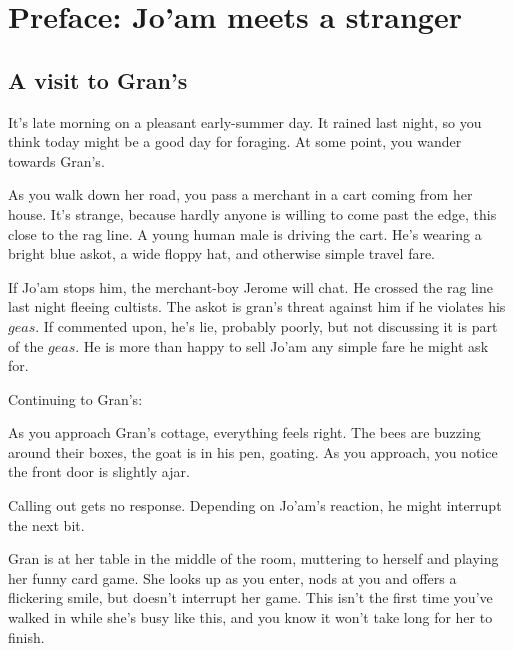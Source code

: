 \section{Preface: Jo'am meets a stranger}\label{sec:joamMeetsAStranger}

\subsection{A visit to Gran's}
\begin{multicols}{2}
  \begin{aloud}
  It's late morning on a pleasant early-summer day.
  It rained last night, so you think today might be a good day for foraging.
  At some point, you wander towards Gran's.

  As you walk down her road, you pass a merchant in a cart coming from her house.
  It's strange, because hardly anyone is willing to come past the edge, this close to the rag line.
  A young human male is driving the cart.
  He's wearing a bright blue askot, a wide floppy hat, and otherwise simple travel fare.
  \end{aloud}

If Jo'am stops him, the merchant-boy Jerome will chat.
He crossed the rag line last night fleeing cultists.
The askot is gran's threat against him if he violates his $geas$.
If commented upon, he's lie, probably poorly, but not discussing it is part of the $geas$.
He is more than happy to sell Jo'am any simple fare he might ask for.

Continuing to Gran's:

  \begin{aloud}
  As you approach Gran's cottage, everything feels right.
  The bees are buzzing around their boxes, the goat is in his pen, goating.
  As you approach, you notice the front door is slightly ajar.
  \end{aloud}

Calling out gets no response.
Depending on Jo'am's reaction, he might interrupt the next bit.

  \begin{aloud}
  Gran is at her table in the middle of the room, muttering to herself and playing her
    funny card game.
  She looks up as you enter, nods at you and offers a flickering smile, but doesn't interrupt
    her game.
  This isn't the first time you've walked in while she's busy like this, and you know it won't
    take long for her to finish.
  \end{aloud}


\end{multicols}
